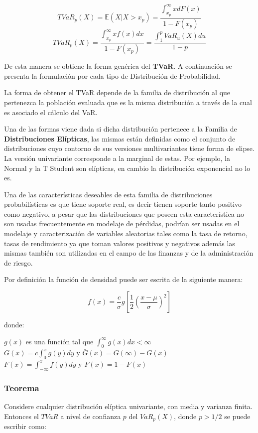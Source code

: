 \documentclass[]{article}
\begin{document}
\[TVaR_p(X)=\mathbb{E}(X|X>x_p)=\frac{\int_{x_p}^{\infty}xdF(x)}{1-F(x_p)}\]
\[TVaR_p(X)=\frac{\int_{x_p}^{\infty}xf(x)dx}{1-F(x_p)}=\frac{\int_{1}^{p}VaR_u(X)du}{1-p}\]

De esta manera se obtiene la forma genérica del \textbf{TVaR}. A
continuación se presenta la formulación por cada tipo de Distribución de
Probabilidad.

La forma de obtener el TVaR depende de la familia de distribución al que
pertenezca la población evaluada que es la misma distribución a través
de la cual es asociado el cálculo del VaR.

Una de las formas viene dada si dicha distribución pertenece a la
Familia de \textbf{Distribuciones Elípticas}, las mismas están definidas
como el conjunto de distribuciones cuyo contorno de sus versiones
multivariantes tiene forma de elipse. La versión univariante corresponde
a la marginal de estas. Por ejemplo, la Normal y la T Student son
elípticas, en cambio la distribución exponencial no lo es.

Una de las características deseables de esta familia de distribuciones
probabilísticas es que tiene soporte real, es decir tienen soporte tanto
positivo como negativo, a pesar que las distribuciones que poseen esta
característica no son usadas frecuentemente en modelaje de pérdidas,
podrían ser usadas en el modelaje y caracterización de variables
aleatorias tales como la tasa de retorno, tasas de rendimiento ya que
toman valores positivos y negativos además las mismas también son
utilizadas en el campo de las finanzas y de la administración de riesgo.

Por definición la función de densidad puede ser escrita de la siguiente
manera:

\[f(x)=\frac{c}{\sigma}g\left[\frac{1}{2}\left(\frac{x-\mu}{\sigma}\right)^2\right]\]

donde:

\(g(x)\) es una función tal que \(\int_{0}^{\infty}g(x)dx < \infty\)\\
\(G(x)=c\int_{0}^{x}g(y)dy\) y \(\bar{G}(x)=G(\infty)-G(x)\)\\
\(F(x)=\int_{-\infty}^{x}f(y)dy\) y \(\bar{F}(x)=1-F(x)\)

\hypertarget{teorema}{%
\subsubsection{Teorema}\label{teorema}}

Considere cualquier distribución elíptica univariante, con media y
varianza finita. Entonces el \(TVaR\) a nivel de confianza \(p\) del
\(VaR_p(X)\), donde \(p > 1/2\) se puede escribir como:
\end{document}
